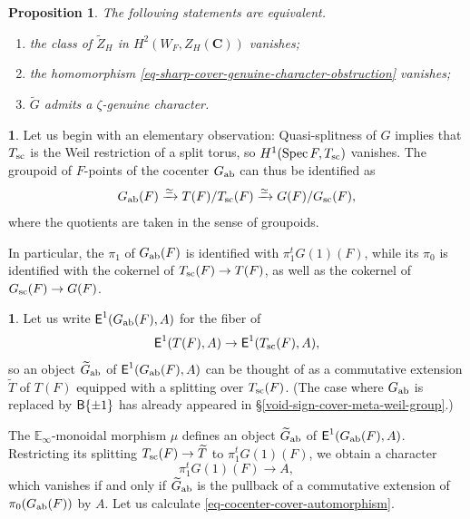 \documentclass[10pt,english,reqno]{amsart}
\newcommand{\complexes}{\mathbf C}
\newcommand{\extension}{\textnormal{\textsf{E}}}
\newcommand{\deloop}{\textnormal{\textsf{B}}}
\newcommand{\Spec}{\operatorname{Spec}}
\newcommand{\sconn}{\textnormal{sc}}
\newcommand{\abelian}{\textnormal{ab}}
\newtheorem{prop}[subsubsection]{Proposition}
\theoremstyle{definition}
\numberwithin{equation}{section}
\newtheorem{untitledsubsubsection}[subsubsection]{}
\newenvironment{void}
{\begin{untitledsubsubsection}}
{\end{untitledsubsubsection}}
\begin{document}

\begin{prop}
\label{prop-genuine-character-obstruction}
The following statements are equivalent.
\begin{enumerate}
	\item the class of $\widetilde Z_H$ in $H^2(W_F, Z_H(\complexes))$ vanishes;
	\item the homomorphism \eqref{eq-sharp-cover-genuine-character-obstruction} vanishes;
	\item $\widetilde G$ admits a $\zeta$-genuine character.
\end{enumerate}
\end{prop}


\begin{void}
Let us begin with an elementary observation: Quasi-splitness of $G$ implies that $T_{\sconn}$ is the Weil restriction of a split torus, so $H^1(\Spec F, T_{\sconn})$ vanishes. The groupoid of $F$-points of the cocenter $G_{\abelian}$ can thus be identified as
\begin{equation}
\label{eq-cocenter-quasisplit-field-valued-points}
G_{\abelian}(F) \xrightarrow{\simeq} T(F)/T_{\sconn}(F) \xrightarrow{\simeq} G(F)/G_{\sconn}(F),
\end{equation}
where the quotients are taken in the sense of groupoids.

In particular, the $\pi_1$ of $G_{\abelian}(F)$ is identified with $\pi_1^t G(1)(F)$, while its $\pi_0$ is identified with the cokernel of $T_{\sconn}(F) \rightarrow T(F)$, as well as the cokernel of $G_{\sconn}(F) \rightarrow G(F)$.
\end{void}


\begin{void}
\label{void-cocenter-cover-automorphism}
Let us write $\extension^1(G_{\abelian}(F), A)$ for the fiber of
$$
\extension^1(T(F), A) \rightarrow \extension^1(T_{\sconn}(F), A),
$$
so an object $\widetilde G_{\abelian}$ of $\extension^1(G_{\abelian}(F), A)$ can be thought of as a commutative extension $\widetilde T$ of $T(F)$ equipped with a splitting over $T_{\sconn}(F)$. (The case where $G_{\abelian}$ is replaced by $\deloop\{\pm 1\}$ has already appeared in \S\ref{void-sign-cover-meta-weil-group}.)

The $\mathbb E_{\infty}$-monoidal morphism $\mu$ defines an object $\widetilde G_{\abelian}$ of $\extension^1(G_{\abelian}(F), A)$. Restricting its splitting $T_{\sconn}(F) \rightarrow \widetilde T$ to $\pi_1^t G(1)(F)$, we obtain a character
\begin{equation}
\label{eq-cocenter-cover-automorphism}
\pi_1^tG(1)(F) \rightarrow A,
\end{equation}
which vanishes if and only if $\widetilde G_{\abelian}$ is the pullback of a commutative extension of $\pi_0(G_{\abelian}(F))$ by $A$. Let us calculate \eqref{eq-cocenter-cover-automorphism}.
\end{void}
\end{document}
